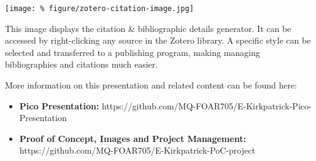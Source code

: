 \documentclass[unknownkeysallowed,usepdftitle=false, parskip=full]{beamer}
\newcommand{\secvariable}{nothing}
\newcommand{\mysection}[1]{\renewcommand{\secvariable}{#1}
}
\begin{document}
\mysection{minor}
\begin{frame}\label{\secvariable} %
\begin{center}
\texttt{[image: \%
figure/zotero-citation-image.jpg]}
\end{center}
\vspace{-0.2cm}

%
This image displays the citation & bibliographic details generator. It can be accessed by right-clicking any source in the Zotero library. A specific style can be selected and transferred to a publishing program, making managing bibliographies and citations much easier.


\end{frame}

\mysection{conclusion}
\begin{frame}\label{\secvariable}

  More information on this presentation and related content can be found here:
    \begin{itemize}
   \item  \textbf{Pico Presentation:} 
   https://github.com/MQ-FOAR705/E-Kirkpatrick-Pico-Presentation
  \item \textbf{Proof of Concept, Images and Project Management:} https://github.com/MQ-FOAR705/E-Kirkpatrick-PoC-project
   \end{itemize}

 

\end{frame}
\end{document}
